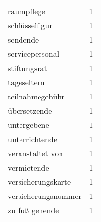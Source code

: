 \begin{tabular}{ll}
raumpflege & 1\\
schlüsselfigur & 1\\
sendende & 1\\
servicepersonal & 1\\
stiftungsrat & 1\\
tageseltern & 1\\
teilnahmegebühr & 1\\
übersetzende & 1\\
untergebene & 1\\
unterrichtende & 1\\
veranstaltet von & 1\\
vermietende & 1\\
versicherungskarte & 1\\
versicherungsnummer & 1\\
zu fuß gehende & 1\\
\bottomrule
\end{tabular}